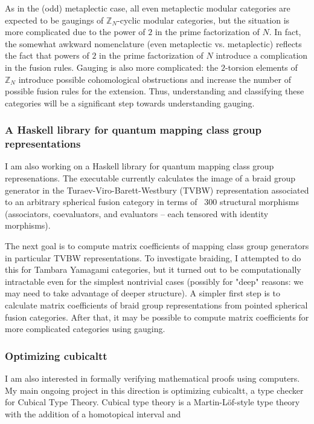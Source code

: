 \documentclass[12pt]{article}
\newcommand{\ZZ}{\mathbb{Z}}
\theoremstyle{plain} \numberwithin{equation}{section}
\theoremstyle{definition}
\begin{document}
As in the (odd) metaplectic case, all even metaplectic modular categories are expected to be gaugings of $\ZZ_{N}$-cyclic modular categories, but the situation is more complicated due to the power of $2$ in the prime factorization of $N$. In fact, the somewhat awkward nomenclature (even metaplectic vs. metaplectic) reflects the fact that powers of $2$ in the prime factorization of $N$ introduce a complication in the fusion rules.   Gauging is also more complicated: the $2$-torsion elements of $\ZZ_N$ introduce possible cohomological obstructions and increase the number of possible fusion rules for the extension.  Thus, understanding and classifying these categories will be a significant step towards understanding gauging.

\subsubsection*{A Haskell library for quantum mapping class group representations}
I am also working on a Haskell library for quantum mapping class group represenations.  The executable currently calculates the image of a braid group generator in the Turaev-Viro-Barett-Westbury (TVBW) representation associated to an arbitrary spherical fusion category in terms of ~300 structural morphisms (associators, coevaluators, and evaluators -- each tensored with identity morphisms).

The next goal is to compute matrix coefficients of mapping class group generators in particular TVBW representations.   To investigate braiding, I attempted to do this for Tambara Yamagami categories, but it turned out to be computationally intractable even for the simplest nontrivial cases (possibly for "deep" reasons: we may need to take advantage of deeper structure).  A simpler first step is to calculate matrix coefficients of braid group representations from pointed spherical fusion categories.  After that, it may be possible to compute matrix coefficients for more complicated categories using gauging.

\subsubsection*{Optimizing cubicaltt}  %
I am also interested in formally verifying mathematical proofs using computers.  My main ongoing project in this direction is optimizing cubicaltt, a type checker for Cubical Type Theory.  Cubical type theory is a Martin-L\"of-style type theory with the addition of a homotopical interval and 
\end{document}
